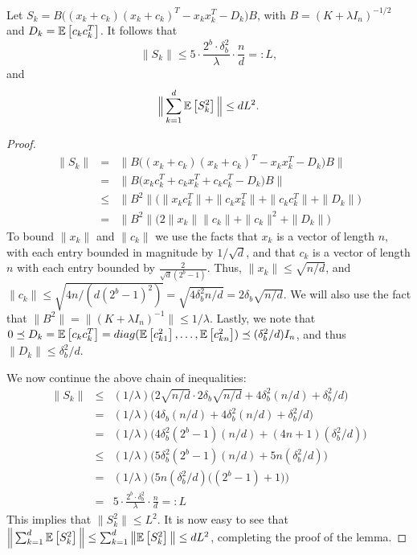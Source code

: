 \documentclass[12pt]{article}
\newcommand{\eqdef}{=:}
\begin{document}
\begin{lemma}
	\label{upper_bounds}
	Let $S_k = B\Big((x_k + c_k)(x_k + c_k)^T  - x_k x_k^T - D_k\Big)B$, with $B=(K+\lambda I_n)^{-1/2}$ and $D_k=\expect{}{c_k c_k^T}$.  It follows that
	$$\|S_k\| \leq 5 \cdot \frac{2^b \cdot \delta_b^2}{\lambda}\cdot  \frac{n}{d} \eqdef L,$$
	and
	$$\Big\|\sum_{k=1}^d \expect{}{S_k^2}\Big\| \leq dL^2.$$
\end{lemma}
\begin{proof}
\begin{eqnarray*}
\|S_k\| &=& \|B\Big((x_k + c_k)(x_k + c_k)^T  - x_k x_k^T - D_k\Big)B\| \\
&=& \|B\Big(x_kc_k^T + c_kx_k^T + c_k c_k^T - D_k\Big)B\| \\
&\leq& \|B^2\|\Big(\|x_kc_k^T\| + \|c_kx_k^T\| + \|c_k c_k^T\| + \|D_k\|\Big) \\
&=& \|B^2\|\Big(2\|x_k\|\|c_k\| + \|c_k\|^2 + \|D_k\|\Big) 
\end{eqnarray*}
To bound $\|x_k\|$ and $\|c_k\|$ we use the facts that $x_k$ is a vector of length $n$, with each entry bounded in magnitude by $1/\sqrt{d}$, and that $c_k$ is a vector of length $n$ with each entry bounded by $\frac{2}{\sqrt{d}(2^b-1)}$.  Thus, $\|x_k\| \leq \sqrt{n/d}$, and $\|c_k\| \leq \sqrt{4n/(d(2^b-1)^2)} = \sqrt{4\delta_b^2n/d} = 2\delta_b\sqrt{n/d}$.  We will also use the fact that $\|B^2\| = \|(K+\lambda I_n)^{-1}\| \leq 1/\lambda$.  Lastly, we note that $0 \preceq D_k = \expect{}{c_k c_k^T} = diag(\expect{}{c_{k1}^2},\ldots,\expect{}{c_{kn}^2}) \preceq (\delta_b^2/d) I_n$, and thus $\|D_k\| \leq \delta_b^2/d$.

We now continue the above chain of inequalities:
\begin{eqnarray*}
\|S_k\| &\leq& (1/\lambda)\Big(2\sqrt{n/d}\cdot 2\delta_b\sqrt{n/d} + 4\delta_b^2(n/d) + \delta_b^2/d\Big)\\
&=& (1/\lambda)\Big(4\delta_b(n/d) + 4\delta_b^2(n/d) + \delta_b^2/d\Big) \\
&=& (1/\lambda)\Big(4\delta_b^2(2^b-1)(n/d) + (4n + 1)(\delta_b^2/d)\Big) \\
&\leq& (1/\lambda)\Big(5\delta_b^2(2^b-1)(n/d) + 5n(\delta_b^2/d)\Big) \\
&=& (1/\lambda)\Big(5n(\delta_b^2/d)\Big((2^b-1)+1\Big)\Big) \\
&=& 5 \cdot \frac{2^b \cdot \delta_b^2}{\lambda}\cdot  \frac{n}{d} \eqdef L
\end{eqnarray*}
This implies that $\|S_k^2\| \leq L^2$.  It is now easy to see that 
$\Big\|\sum_{k=1}^d \expect{}{S_k^2}\Big\| \leq \sum_{k=1}^d \big\|\expect{}{S_k^2}\big\| \leq dL^2$, completing the proof of the lemma.
\end{proof}
	
\end{document}
